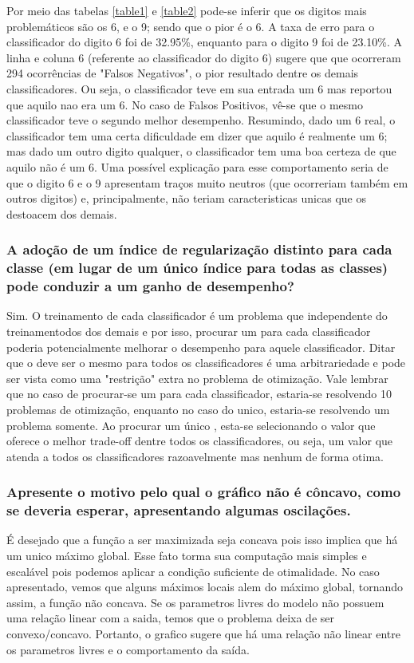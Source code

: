 \documentclass[a4paper]{article}
\begin{document}
Por meio das tabelas \ref{table1} e \ref{table2} pode-se inferir que os digitos mais problemáticos são os 6, e o 9; sendo que o pior é o 6. A taxa de erro para o classificador do digito 6 foi de 32.95\%, enquanto para o digito 9 foi de 23.10\%. A linha e coluna 6 (referente ao classificador do digito 6) sugere que que ocorreram 294 ocorrências de "Falsos Negativos", o pior resultado dentre os demais classificadores. Ou seja, o classificador teve em sua entrada um 6 mas reportou que aquilo nao era um 6. No caso de Falsos Positivos, vê-se que o mesmo classificador teve o segundo melhor desempenho. Resumindo, dado um 6 real, o classificador tem uma certa dificuldade em dizer que aquilo é realmente um 6; mas dado um outro digito qualquer, o classificador tem uma boa certeza de que aquilo não é um 6. Uma possível explicação para esse comportamento seria de que o digito 6 e o 9 apresentam traços muito neutros (que ocorreriam também em outros digitos) e, principalmente, não teriam caracteristicas unicas que os destoacem dos demais.

\subsubsection{A adoção de um índice de regularização distinto para cada classe (em lugar de um único índice para todas as classes) pode conduzir a um ganho de desempenho?}
Sim. O treinamento de cada classificador é um problema que independente do treinamentodos dos demais e por isso, procurar um \textlambda  para cada classificador poderia potencialmente melhorar o desempenho para aquele classificador. Ditar que o \textlambda  deve ser o mesmo para todos os classificadores é uma arbitrariedade e pode ser vista como uma "restrição" extra no problema de otimização. Vale lembrar que no caso de procurar-se um \textlambda  para cada classificador, estaria-se resolvendo 10 problemas de otimização, enquanto no caso do \textlambda unico, estaria-se resolvendo um problema somente. Ao procurar um único \textlambda, esta-se selecionando o valor que oferece o melhor trade-off dentre todos os classificadores, ou seja, um valor que atenda a todos os classificadores razoavelmente mas nenhum de forma otima.

\subsubsection{Apresente o motivo pelo qual o gráfico não é côncavo, como se deveria esperar, apresentando algumas oscilações.}
É desejado que a função a ser maximizada seja concava pois isso implica que há um unico máximo global. Esse fato torma sua computação mais simples e escalável pois podemos aplicar a condição suficiente de otimalidade. No caso apresentado, vemos que alguns máximos locais alem do máximo global, tornando assim, a função não concava. Se os parametros livres do modelo não possuem uma relação linear com a saida, temos que o problema deixa de ser convexo/concavo. Portanto, o grafico sugere que há uma relação não linear entre os parametros livres e o comportamento da saída.
\end{document}
